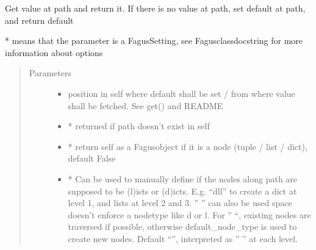 \documentclass[a4paper,10pt,english]{sphinxmanual}
\begin{document}
\begin{fulllineitems}
\begin{fulllineitems}
\label{\detokenize{fagus.fagus:fagus.fagus.Fagus.setdefault}}
\pysigstartsignatures
{}
\pysigstopsignatures
\sphinxAtStartPar
Get value at path and return it. If there is no value at path, set default at path, and return default

\sphinxAtStartPar
* means that the parameter is a Fagus\sphinxhyphen{}Setting, see Fagus\sphinxhyphen{}class\sphinxhyphen{}docstring for more information about options
\begin{quote}\begin{description}
\item[{Parameters}] \leavevmode\begin{itemize}
\item {}
\sphinxAtStartPar
{} \textendash{} position in self where default shall be set / from where value shall be fetched. See get() and README

\item {}
\sphinxAtStartPar
{} \textendash{} * returned if path doesn’t exist in self

\item {}
\sphinxAtStartPar
{} \textendash{} * return self as a Fagus\sphinxhyphen{}object if it is a node (tuple / list / dict), default False

\item {}
\sphinxAtStartPar
{} \textendash{} * Can be used to manually define if the nodes along path are supposed to be (l)ists or
(d)icts. E.g. “dll” to create a dict at level 1, and lists at level 2 and 3. ” ” can also be used \sphinxhyphen{}
space doesn’t enforce a node\sphinxhyphen{}type like d or l. For ” “, existing nodes are traversed if possible,
otherwise default\_node\_type is used to create new nodes. Default “”, interpreted as ” ” at each level.


\end{itemize}
\end{description}
\end{quote}
\end{fulllineitems}
\end{fulllineitems}
\end{document}
